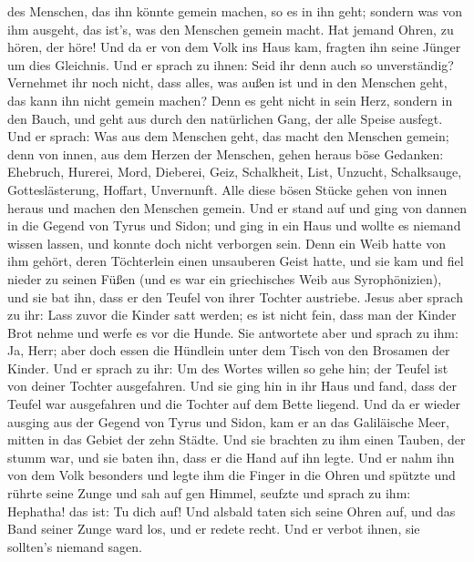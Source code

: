 des Menschen, das ihn könnte gemein machen, so es in ihn geht; sondern
was von ihm ausgeht, das ist's, was den Menschen gemein macht.
 Hat jemand Ohren, zu hören, der höre!  Und da
er von dem Volk ins Haus kam, fragten ihn seine Jünger um dies
Gleichnis.  Und er sprach zu ihnen: Seid ihr denn auch so
unverständig? Vernehmet ihr noch nicht, dass alles, was außen ist und in
den Menschen geht, das kann ihn nicht gemein machen?  Denn
es geht nicht in sein Herz, sondern in den Bauch, und geht aus durch den
natürlichen Gang, der alle Speise ausfegt.  Und er sprach:
Was aus dem Menschen geht, das macht den Menschen gemein; 
denn von innen, aus dem Herzen der Menschen, gehen heraus böse Gedanken:
Ehebruch, Hurerei, Mord,  Dieberei, Geiz, Schalkheit, List,
Unzucht, Schalksauge, Gotteslästerung, Hoffart, Unvernunft.
 Alle diese bösen Stücke gehen von innen heraus und machen
den Menschen gemein.  Und er stand auf und ging von dannen
in die Gegend von Tyrus und Sidon; und ging in ein Haus und wollte es
niemand wissen lassen, und konnte doch nicht verborgen sein.
 Denn ein Weib hatte von ihm gehört, deren Töchterlein
einen unsauberen Geist hatte, und sie kam und fiel nieder zu seinen
Füßen  (und es war ein griechisches Weib aus
Syrophönizien), und sie bat ihn, dass er den Teufel von ihrer Tochter
austriebe.  Jesus aber sprach zu ihr: Lass zuvor die Kinder
satt werden; es ist nicht fein, dass man der Kinder Brot nehme und werfe
es vor die Hunde.  Sie antwortete aber und sprach zu ihm:
Ja, Herr; aber doch essen die Hündlein unter dem Tisch von den Brosamen
der Kinder.  Und er sprach zu ihr: Um des Wortes willen so
gehe hin; der Teufel ist von deiner Tochter ausgefahren. 
Und sie ging hin in ihr Haus und fand, dass der Teufel war ausgefahren
und die Tochter auf dem Bette liegend.  Und da er wieder
ausging aus der Gegend von Tyrus und Sidon, kam er an das Galiläische
Meer, mitten in das Gebiet der zehn Städte.  Und sie
brachten zu ihm einen Tauben, der stumm war, und sie baten ihn, dass er
die Hand auf ihn legte.  Und er nahm ihn von dem Volk
besonders und legte ihm die Finger in die Ohren und spützte und rührte
seine Zunge  und sah auf gen Himmel, seufzte und sprach zu
ihm: Hephatha! das ist: Tu dich auf!  Und alsbald taten
sich seine Ohren auf, und das Band seiner Zunge ward los, und er redete
recht.  Und er verbot ihnen, sie sollten's niemand sagen.
